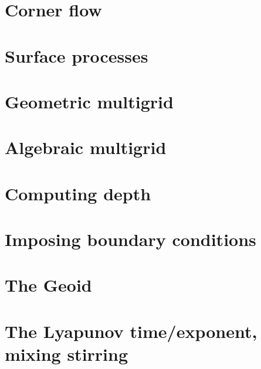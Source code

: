 \section{Corner flow} \label{sec:cornerflow}  %
\newpage %
\section{Surface processes \label{sec:surfaceprocesses}}  %
\newpage %
\section{Geometric multigrid}  %
\newpage %
\section{Algebraic multigrid}  %
\newpage %
\section{Computing depth \label{ss:depth}}  %
\newpage %
\section{Imposing boundary conditions \label{ss:howtobc}}  %
\newpage %
\section{The Geoid} \label{ss:geoid}  %
\newpage %
\section{The Lyapunov time/exponent, mixing stirring}\label{ss:lyapunov} %
\newpage %
